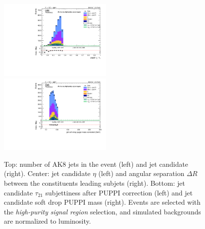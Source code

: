 \begin{figure}[!htb]
\begin{center}
    \includegraphics[width=0.495\textwidth]{plots/v9_U/XVZnnhpSR/FatJet1_puppiTau21.pdf}
    \includegraphics[width=0.495\textwidth]{plots/v9_U/XVZnnhpSR/FatJet1_softdropPuppiMassCorr.pdf}

    \caption{Top: number of AK8 jets in the event (left) and \V jet candidate \pt (right). Center: \V jet candidate $\eta$ (left) and angular separation $\Delta R$ between the constituents leading subjets (right). Bottom: \V jet candidate $\tau_{21}$ subjettiness after PUPPI correction (left) and \V jet candidate soft drop PUPPI mass (right). Events are selected with the \emph{high-purity signal region} selection, and simulated backgrounds are normalized to luminosity.}
  \end{center}
\end{figure}


